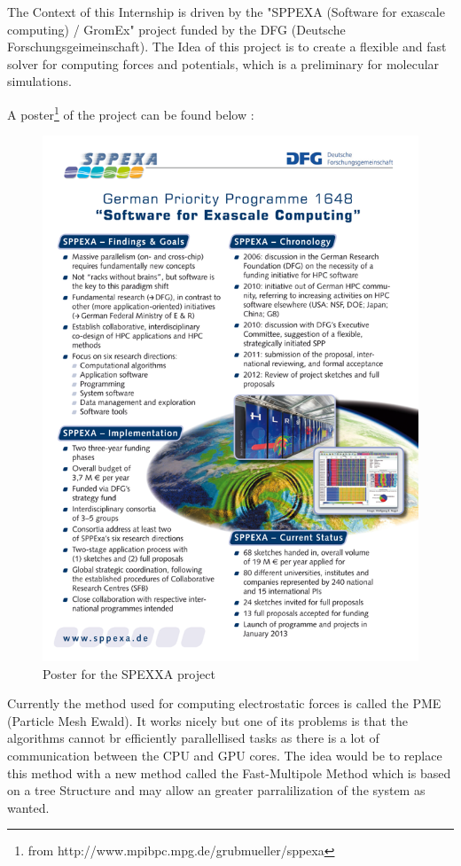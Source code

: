 \documentclass[12pt,twoside,a4paper]{report}
\begin{document}
The Context of this Internship is driven by the "SPPEXA (Software for exascale computing) / GromEx" project funded by the DFG (Deutsche Forschungsgeimeinschaft).
The Idea of this project is to create a flexible and fast solver for computing forces and potentials, which is a preliminary for molecular simulations.

A poster\footnote{from http://www.mpibpc.mpg.de/grubmueller/sppexa}   of the project can be found below :

\begin{figure}[H]

\includegraphics[scale=2]{sppexa-poster}
 \centering
 
\caption{Poster for the SPEXXA project}

\label{fig:poster}

\end{figure}


Currently the method used for computing electrostatic forces is called the PME (Particle Mesh Ewald). It works nicely but one of its problems is that the algorithms cannot br efficiently parallellised tasks as there is a lot of communication between the CPU and GPU cores. The idea would be to replace this method with a new method called the Fast-Multipole Method which is based on a tree Structure and may allow an greater parralilization of the system as wanted.\\
\end{document}
